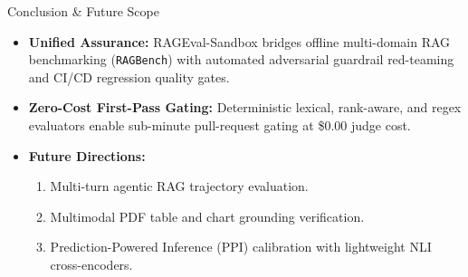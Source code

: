 \documentclass[aspectratio=169, 10pt]{beamer}
\begin{document}
\begin{frame}{Conclusion \& Future Scope}
    \begin{itemize}
        \item \textbf{Unified Assurance:} RAGEval-Sandbox bridges offline multi-domain RAG benchmarking (\texttt{RAGBench}) with automated adversarial guardrail red-teaming and CI/CD regression quality gates.
        \item \textbf{Zero-Cost First-Pass Gating:} Deterministic lexical, rank-aware, and regex evaluators enable sub-minute pull-request gating at \$0.00 judge cost.
        \item \textbf{Future Directions:}
        \begin{enumerate}
            \item Multi-turn agentic RAG trajectory evaluation.
            \item Multimodal PDF table and chart grounding verification.
            \item Prediction-Powered Inference (PPI) calibration with lightweight NLI cross-encoders.
        \end{enumerate}
    \end{itemize}
\end{frame}
\end{document}
